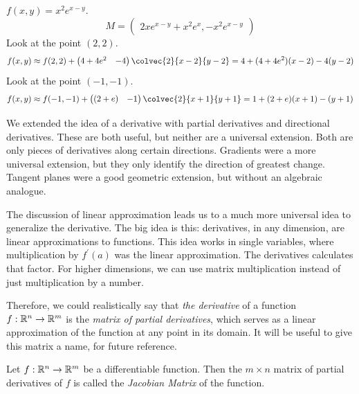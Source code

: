 \documentclass[fleqn,letterpaper]{report}
\begin{document}
\begin{example}
$f(x,y) = x^2 e^{x-y}$. 
\begin{equation*}
M = \left( \begin{matrix} 2xe^{x-y} + x^2e^x, -x^2 e^{x-y}
 \end{matrix} \right) 
\end{equation*}
Look at the point $(2,2)$.
\begin{equation*}
f(x,y) \approx f(2,2) + \left( \begin{matrix} 4+4e^2 & -4 
\end{matrix} \right) \colvec{2}{x-2}{y-2} = 4 + (4+4e^2)(x-2) -
4(y-2)
\end{equation*}
Look at the point $(-1,-1)$.
\begin{equation*}
f(x,y) \approx f(-1,-1) + \left( \begin{matrix} (2+e) & -1 
\end{matrix} \right) \colvec{2}{x+1}{y+1} = 1 + (2+e)(x+1) - (y+1)
\end{equation*}
\end{example}

We extended the idea of a derivative with partial
derivatives and directional derivatives. These are both
useful, but neither are a universal extension. Both are only
pieces of derivatives along certain directions. Gradients were
a more universal extension, but they only identify the
direction of greatest change. Tangent planes were a good
geometric extension, but without an algebraic analogue. 


The discussion of linear approximation 
leads us to a much more universal idea to
generalize the derivative. The big idea is this:
derivatives, in any dimension, are linear approximations to
functions. This idea works in single variables, where
multiplication by $f^\prime(a)$ was the linear approximation.
The derivatives calculates that factor. For higher
dimensions, we can use matrix multiplication instead of just
multiplication by a number. 

Therefore, we could realistically say that \emph{the
derivative} of a function $f: \mathbb{R}^n \rightarrow \mathbb{R}^m$ is the
\emph{matrix of partial derivatives}, which serves as a linear
approximation of the function at any point in its domain. 
It will be useful to give this matrix a name, for future
reference. 

\begin{defn}
Let $f: \mathbb{R}^n \rightarrow \mathbb{R}^m$ be a differentiable
function. Then the $m \times n$ matrix of partial derivatives
of $f$ is called the \emph{Jacobian Matrix} of the function.
\end{defn}
\end{document}
